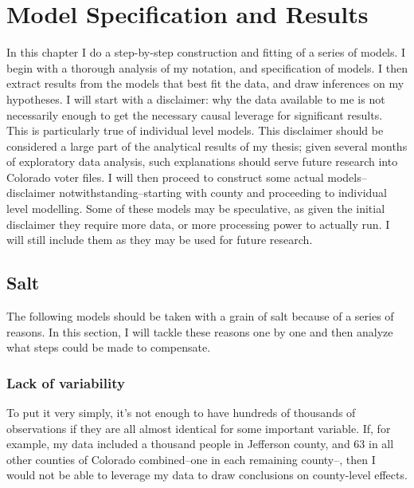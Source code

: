 \documentclass[12pt,twoside]{reedthesis}
\begin{document}
  \chapter{Model Specification and
  Results}\label{model-specification-and-results}
  
  In this chapter I do a step-by-step construction and fitting of a series
  of models. I begin with a thorough analysis of my notation, and
  specification of models. I then extract results from the models that
  best fit the data, and draw inferences on my hypotheses. I will start
  with a disclaimer: why the data available to me is not necessarily
  enough to get the necessary causal leverage for significant results.
  This is particularly true of individual level models. This disclaimer
  should be considered a large part of the analytical results of my
  thesis; given several months of exploratory data analysis, such
  explanations should serve future research into Colorado voter files. I
  will then proceed to construct some actual models--disclaimer
  notwithstanding--starting with county and proceeding to individual level
  modelling. Some of these models may be speculative, as given the initial
  disclaimer they require more data, or more processing power to actually
  run. I will still include them as they may be used for future research.
  
  \section{Salt}\label{salt}
  
  The following models should be taken with a grain of salt because of a
  series of reasons. In this section, I will tackle these reasons one by
  one and then analyze what steps could be made to compensate.
  
  \subsection{Lack of variability}\label{lack-of-variability}
  
  To put it very simply, it's not enough to have hundreds of thousands of
  observations if they are all almost identical for some important
  variable. If, for example, my data included a thousand people in
  Jefferson county, and 63 in all other counties of Colorado combined--one
  in each remaining county--, then I would not be able to leverage my data
  to draw conclusions on county-level effects.
  
\end{document}
